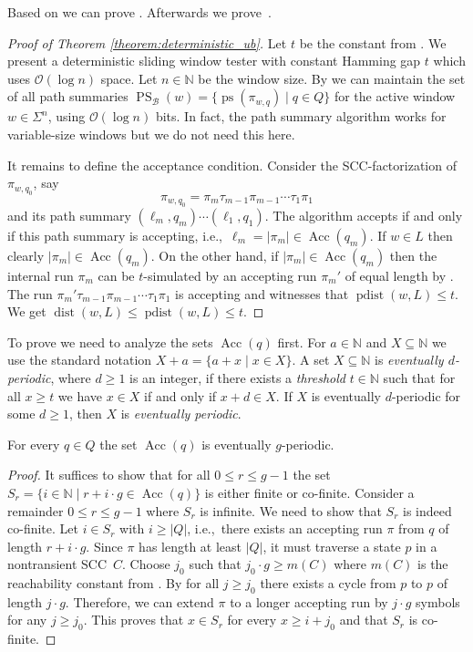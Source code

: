 \documentclass{theoretics}
\newcommand{\N}{\mathbb{N}}
\newcommand{\B}{\mathcal{B}}
\renewcommand{\O}{\mathcal{O}}
\DeclareMathOperator{\ps}{ps}
\DeclareMathOperator{\PS}{PS}
\DeclareMathOperator{\dist}{dist}
\DeclareMathOperator{\pdist}{pdist}
\DeclareMathOperator{\Acc}{Acc}
\renewcommand{\geq}{\geqslant}
\renewcommand{\leq}{\leqslant}
\renewcommand{\ge}{\geq}
\renewcommand{\le}{\leq}
\begin{document}
Based on  we can prove . Afterwards we prove~.

\begin{proof}[Proof of Theorem  \ref{theorem:deterministic_ub}]
Let $t$ be the constant from .
We present a deterministic sliding window tester with constant Hamming gap $t$ which uses $\O(\log n)$ space.
Let $n \in \N$ be the window size.
By  we can maintain the set of all path summaries
$\PS_\B(w) = \{ \ps(\pi_{w,q}) \mid q \in Q \}$ for the active window $w \in \Sigma^n$,
using $\O(\log n)$ bits.
In fact, the path summary algorithm works for variable-size windows but we do not need this here.

It remains to define the acceptance condition.
Consider the SCC-factoriza\-tion of $\pi_{w,q_0}$,
say 
\[  \pi_{w,q_0} = \pi_m \tau_{m-1} \pi_{m-1} \cdots \tau_1 \pi_1 \]
and its path summary $(\ell_m,q_m) \cdots (\ell_1,q_1)$.
The algorithm accepts if and only if this path summary is accepting, i.e.,~$\ell_m = |\pi_m| \in \Acc(q_m)$.
If $w \in L$ then clearly $|\pi_m| \in \Acc(q_m)$.
On the other hand, if $|\pi_m| \in \Acc(q_m)$
then the internal run $\pi_m$ can be $t$-simulated by an accepting run $\pi_m'$ of equal length by .
The run $\pi_m' \tau_{m-1} \pi_{m-1} \cdots \tau_1 \pi_1$ is accepting
and witnesses that $\pdist(w,L) \le t$. We get $\dist(w, L) \leq \pdist(w,L) \leq t$.
\end{proof}

To prove  we need to analyze the sets $\Acc(q)$ first.
For $a \in \N$ and $X \subseteq \N$ we use the standard notation
$X + a = \{a+x \mid x \in X\}$.
A set $X \subseteq \N$ is {\em eventually $d$-periodic},
where $d \ge 1$ is an integer,
if there exists a {\em threshold} $t \in \N$ such that for all $x \ge t$
we have $x \in X$ if and only if $x + d \in X$.
If $X$ is eventually $d$-periodic for some $d \ge 1$, then $X$ is {\em eventually periodic}.

\begin{lemma}
\label{lem:acc-per}
For every $q \in Q$ the set $\Acc(q)$ is eventually $g$-periodic.
\end{lemma}

\begin{proof}
	It suffices to show that for all $0 \le r \le g-1$
	the set $S_r = \{ i \in \N \mid r + i \cdot g \in \Acc(q) \}$
	is either finite or co-finite.
	Consider a remainder $0 \le r \le g-1$ where $S_r$ is infinite.
	We need to show that $S_r$ is indeed co-finite.
	Let $i \in S_r$ with $i \ge |Q|$,
	i.e.,~there exists an accepting run $\pi$ from $q$ of length $r + i \cdot g$.
	Since $\pi$ has length at least $|Q|$, it must traverse a state $p$ in a nontransient SCC~$C$.
	Choose $j_0$ such that $j_0 \cdot g \ge m(C)$
	where $m(C)$ is the reachability constant from .
	By  for all $j \ge j_0$
	there exists a cycle from $p$ to $p$ of length $j \cdot g$.
	Therefore, we can extend $\pi$ to a longer accepting run by $j \cdot g$ symbols
	for any $j \ge j_0$.
	This proves that $x \in S_r$ for every $x \geq i + j_0$
	and that $S_r$ is co-finite.
\end{proof}
\end{document}
